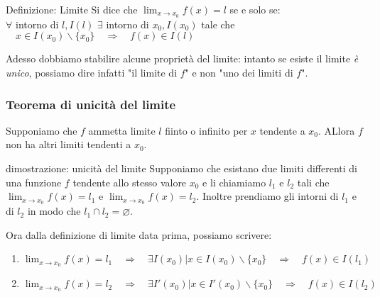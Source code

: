 \documentclass[x11names]{article}
\begin{document}
\begin{center}
\colorbox{Azure2}{\begin{minipage}{5.75in}
\begin{blues}{Definizione: Limite}
Si dice che $\lim_{x\to x_0}f\left(x\right) = l$ se e solo se: \\
$\forall$ intorno di $l, I\left(l\right)$ $\exists$ intorno di $x_0, I\left(x_0\right)$ tale che $\quad x \in I\left(x_0\right) \backslash\{x_0\} \quad \Rightarrow \quad f\left(x\right) \in I\left(l\right)$ 
\end{blues}
\end{minipage}}       
\end{center}




Adesso dobbiamo stabilire alcune proprietà del limite: intanto se esiste il limite \textit{è unico}, possiamo dire infatti "il limite di $f$" e non "uno dei limiti di $f$".

\subsubsection{Teorema di unicità del limite} Supponiamo che $f$ ammetta limite $l$ fiinto o infinito per $x$ tendente a $x_0$. ALlora $f$ non ha altri limiti tendenti a $x_0$.

\begin{es}{dimostrazione: unicità del limite} 
Supponiamo che esistano due limiti differenti di una funzione $f$ tendente allo stesso valore $x_0$ e li chiamiamo $l_1$ e $l_2$ tali che $\lim_{x\to x_0}f\left(x\right) = l_1$ e $\lim_{ x\to x_0}f\left(x\right) = l_2$. Inoltre prendiamo gli intorni di  $l_1$ e di $l_2$ in modo che $l_1 \cap l_2 = \varnothing$.
	
\begin{center}

\end{center}


Ora dalla definizione di limite data prima, possiamo scrivere:
\begin{enumerate}
	\item $\lim_{x\to x_0}f\left(x\right) = l_1 \quad \Rightarrow \quad  \exists I\left(x_0\right) | x \in I\left(x_0\right) \backslash \{x_0\} \quad \Rightarrow \quad f\left(x\right) \in I\left(l_1\right)$
	\item $\lim_{x\to x_0}f\left(x\right) = l_2 \quad \Rightarrow \quad  \exists I'\left(x_0\right) | x \in I'\left(x_0\right) \backslash \{x_0\} \quad \Rightarrow \quad f\left(x\right) \in I\left(l_2\right)$
\end{enumerate}
\end{es}
\end{document}
